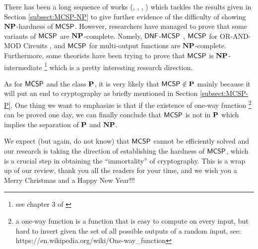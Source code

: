 \documentclass[11pt]{article}
\begin{document}
There has been a long sequence of works (\cite{hitchcock2015np}, \cite{allender2017minimum}, \cite{murray2017non}, \cite{allender2019new}) which tackles the results given in Section \ref{subsect:MCSP-NP} to give further evidence of the difficulty of showing $\NP$-hardness of $\mathprob{MCSP}$. However, researchers have managed to prove that some variants of $\mathprob{MCSP}$ are $\NP$-complete. Namely, $\mathprob{DNF}$-$\mathprob{MCSP}$ \cite{masek1979some}, $\mathprob{MCSP}$ for OR-AND-MOD Circuits \cite{hirahara2018np}, and $\mathprob{MCSP}$ for multi-output functions \cite{ilango2020np} are $\NP$-complete. Furthermore, some theorists have been trying to prove that $\mathprob{MCSP}$ is $\NP$-intermediate \footnote{see chapter 3 of \cite{arora2009}} which is a pretty interesting research direction.

As for $\mathprob{MCSP}$ and the class $\P$, it is very likely that $\mathprob{MCSP} \notin \P$ mainly because it will put an end to cryptography as briefly mentioned in Section \ref{subsect:MCSP-P}. One thing we want to emphasize is that if the existence of one-way function \footnote{a one-way function is a function that is easy to compute on every input, but hard to invert given the set of all possible outputs of a random input, see: https://en.wikipedia.org/wiki/One-way\_function} can be proved one day, we can finally conclude that $\mathprob{MCSP}$ is not in $\P$ which implies the separation of $\P$ and $\NP$.

We expect (but again, do not know) that $\mathprob{MCSP}$ cannot be efficiently solved and our research is taking the direction of establishing the hardness of $\mathprob{MCSP}$, which is a crucial step in obtaining the ``immortality'' of cryptography. This is a wrap up of our review, thank you all the readers for your time, and we wish you a Merry Christmas and a Happy New Year!!!



\end{document}
